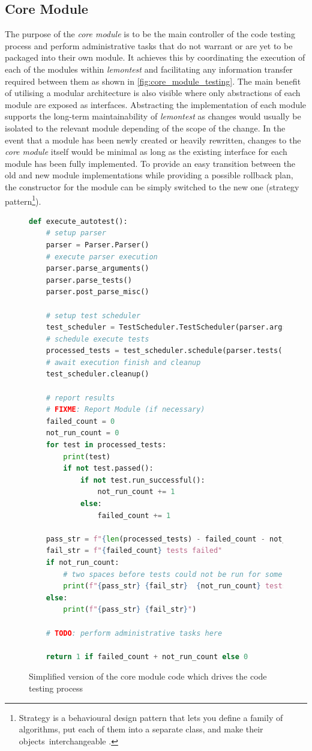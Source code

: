 \documentclass[hidelinks]{report}
\begin{document}
\subsection{Core Module}
The purpose of the \textit{core module} is to be the main controller of the code testing process and perform administrative tasks that do not warrant or are yet to be packaged into their own module. It achieves this by coordinating the execution of each of the modules within \textit{lemontest} and facilitating any information transfer required between them as shown in \autoref{fig:core_module_testing}. The main benefit of utilising a modular architecture is also visible where only abstractions of each module are exposed as interfaces. Abstracting the implementation of each module supports the long-term maintainability of \textit{lemontest} as changes would usually be isolated to the relevant module depending of the scope of the change. In the event that a module has been newly created or heavily rewritten, changes to the \textit{core module} itself would be minimal as long as the existing interface for each module has been fully implemented. To provide an easy transition between the old and new module implementations while providing a possible rollback plan, the constructor for the module can be simply switched to the new one (strategy pattern\footnote{Strategy is a behavioural design pattern that lets you define a family of algorithms, put each of them into a separate class, and make their objects interchangeable \cite{strategyPattern}.}).
\begin{figure}[h]
	\centering
	\begin{lstlisting}[language=python, breaklines=true, linewidth=\linewidth, tabsize=4]
def execute_autotest():
	# setup parser
	parser = Parser.Parser()
	# execute parser execution
	parser.parse_arguments()
	parser.parse_tests()
	parser.post_parse_misc()

	# setup test scheduler
	test_scheduler = TestScheduler.TestScheduler(parser.args(), parser.params())
	# schedule execute tests
	processed_tests = test_scheduler.schedule(parser.tests())
	# await execution finish and cleanup
	test_scheduler.cleanup()

	# report results
	# FIXME: Report Module (if necessary)
	failed_count = 0
	not_run_count = 0
	for test in processed_tests:
		print(test)
		if not test.passed():
			if not test.run_successful():
				not_run_count += 1
			else:
				failed_count += 1
			
	pass_str = f"{len(processed_tests) - failed_count - not_run_count} tests passed"
	fail_str = f"{failed_count} tests failed"
	if not_run_count:
		# two spaces before tests could not be run for some reason (autotest output parity)
		print(f"{pass_str} {fail_str}  {not_run_count} tests could not be run")
	else:
		print(f"{pass_str} {fail_str}")
	
	# TODO: perform administrative tasks here
	
	return 1 if failed_count + not_run_count else 0
	\end{lstlisting}
	\caption{Simplified version of the core module code which drives the code testing process}
	\label{fig:core_module_testing}
\end{figure}
\end{document}
